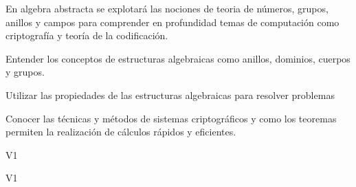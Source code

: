 \begin{syllabus}


\begin{justification}
En algebra abstracta se explotará las nociones de teoria de números, grupos, anillos y campos para comprender en profundidad temas de computación como criptografía y teoría de la codificación.
\end{justification}

\begin{goals}
	\item Entender los conceptos de estructuras algebraicas como anillos, dominios, cuerpos y grupos.
	\item Utilizar las propiedades de las estructuras algebraicas para resolver problemas  
	\item  Conocer las técnicas y métodos de sistemas criptográficos y como los teoremas permiten la realización de cálculos rápidos y eficientes.
\end{goals}
\begin{outcomes}{V1}
    \item {}
    \item {}
    \item {}
 \end{outcomes}

\begin{competences}{V1}
    \item {}
    \item {}
    \item {}
    \item {}
\end{competences}


\end{syllabus}
